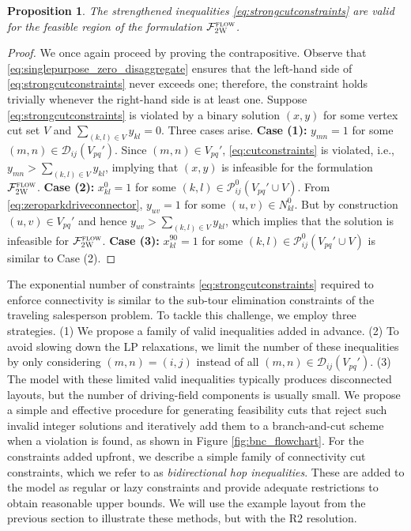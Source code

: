 \documentclass[10pt]{article}
\newcommand{\zeroparkvar}[2]{x^{0}_{#1#2}}
\newcommand{\ninetyparkvar}[2]{x^{90}_{#1#2}}
\newcommand{\drivevar}[2]{y_{#1#2}}
\newcommand{\zeroneighborset}[2]{N_{#1#2}^{0}}
\newcommand{\entrancex}{p}
\newcommand{\entrancey}{q}
\newcommand{\vertexcutset}{V}
\newcommand{\twowaypartitioncomp}[1]{V_{#1}'}
\newcommand{\invzeroparksetcut}[3]{\mathcal{P}^{0}_{#1#2}(#3)}
\newcommand{\invdrivesetcut}[3]{\mathcal{D}_{#1#2}(#3)}
\newtheorem{proposition}{Proposition}
\theoremstyle{definition}
\begin{document}
\begin{proposition}
\label{prop:2w_strengthened}
The strengthened inequalities \eqref{eq:strongcutconstraints} are valid for the feasible region of the formulation $\mathcal{F}^{\textsc{flow}}_{\textsc{2W}}$.
\end{proposition}
\begin{proof}
We once again proceed by proving the contrapositive. Observe that \eqref{eq:singlepurpose_zero_disaggregate} ensures that the left-hand side of \eqref{eq:strongcutconstraints} never exceeds one; therefore, the constraint holds trivially whenever the right-hand side is at least one. Suppose \eqref{eq:strongcutconstraints} is violated by a binary solution $(x, y)$ for some vertex cut set $\vertexcutset$ and $\sum_{(k,l) \in \vertexcutset} \drivevar{k}{l} = 0$. Three cases arise. \textbf{Case (1):} $y_{mn} = 1$ for some $(m, n) \in \invdrivesetcut{i}{j}{\twowaypartitioncomp{\entrancex \entrancey}}$. Since $(m,n) \in \twowaypartitioncomp{\entrancex \entrancey}$, \eqref{eq:cutconstraints} is violated, i.e., $\drivevar{m}{n} > \sum_{(k,l) \in \vertexcutset} \drivevar{k}{l}$, implying that $(x, y)$ is infeasible for the formulation $\mathcal{F}^{\textsc{flow}}_{\textsc{2W}}$. \textbf{Case (2):} $\zeroparkvar{k}{l} = 1$ for some $(k, l) \in \invzeroparksetcut{i}{j}{{\twowaypartitioncomp{\entrancex \entrancey} \cup \vertexcutset}}$. From \eqref{eq:zeroparkdriveconnector}, $\drivevar{u}{v} = 1$ for some $(u,v) \in \zeroneighborset{k}{l}$. But by construction $(u, v) \in \twowaypartitioncomp{\entrancex \entrancey}$ and hence $\drivevar{u}{v} > \sum_{(k,l) \in \vertexcutset} \drivevar{k}{l}$, which implies that the solution is infeasible for $\mathcal{F}^{\textsc{flow}}_{\textsc{2W}}$. \textbf{Case (3):}  $\ninetyparkvar{k}{l} = 1$ for some $(k, l) \in \invzeroparksetcut{i}{j}{{\twowaypartitioncomp{\entrancex \entrancey} \cup \vertexcutset}}$ is similar to Case (2). 
\end{proof}

The exponential number of constraints \eqref{eq:strongcutconstraints} required to enforce connectivity is similar to the sub-tour elimination constraints of the traveling salesperson problem. To tackle this challenge, we employ three strategies. (1) We propose a family of valid inequalities added in advance. (2) To avoid slowing down the LP relaxations, we limit the number of these inequalities by only considering $(m, n) = (i, j)$ instead of all $(m, n) \in \invdrivesetcut{i}{j}{\twowaypartitioncomp{pq}}$.  (3) The model with these limited valid inequalities typically produces disconnected layouts, but the number of driving-field components is usually small. We propose a simple and effective procedure for generating feasibility cuts that reject such invalid integer solutions and iteratively add them to a branch-and-cut scheme when a violation is found, as shown in Figure \ref{fig:bnc_flowchart}. For the constraints added upfront, we describe a simple family of connectivity cut constraints, which we refer to as \textit{bidirectional hop inequalities}.  These are added to the model as regular or lazy constraints and provide adequate restrictions to obtain reasonable upper bounds. We will use the example layout from the previous section to illustrate these methods, but with the R2 resolution. 
\end{document}
